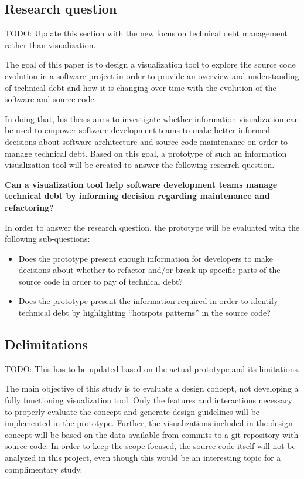 \subsection{Research question}

TODO: Update this section with the new focus on technical debt management rather than visualization.

The goal of this paper is to design a visualization tool to explore the source code evolution in a software project in order to provide an overview and understanding of technical debt and how it is changing over time with the evolution of the software and source code. 

In doing that, his thesis aims to investigate whether information visualization can be used to empower software development teams to make better informed decisions about software architecture and source code maintenance on order to manage technical debt. Based on this goal, a prototype of such an information visualization tool will be created to answer the following research question.


\smallskip
\textbf{
Can a visualization tool help software development teams manage technical debt by informing decision regarding maintenance and refactoring?
}
\smallskip

In order to answer the research question, the prototype will be evaluated with the following sub-questions:
\begin{itemize}
\item Does the prototype present enough information for developers to make decisions about whether to refactor and/or break up specific parts of the source code in order to pay of technical debt?
\item Does the prototype present the information required in order to identify technical debt by highlighting “hotspots patterns” \cite{mo_hotspot_2015} in the source code?
\end{itemize}

\subsection{Delimitations}

TODO: This has to be updated based on the actual prototype and its limitations.

The main objective of this study is to evaluate a design concept, not developing a fully functioning visualization tool. Only the features and interactions necessary to properly evaluate the concept and generate design guidelines will be implemented in the prototype. Further, the visualizations included in the design concept will be based on the data available from commits to a git repository with source code. In order to keep the scope focused, the source code itself will not be analyzed in this project, even though this would be an interesting topic for a complimentary study.